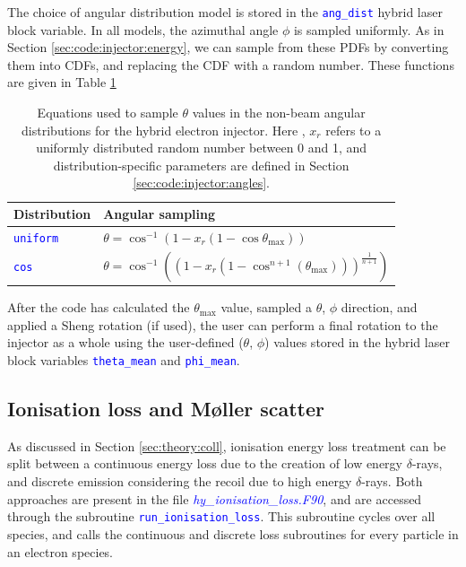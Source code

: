 \documentclass[12pt]{article}
\numberwithin{equation}{section}
\begin{document}
The choice of angular distribution model is stored in the \textcolor{blue}{\texttt{ang\_dist}} hybrid laser block variable. In all models, the azimuthal angle $\phi$ is sampled uniformly. As in Section \ref{sec:code:injector:energy}, we can sample from these PDFs by converting them into CDFs, and replacing the CDF with a random number. These functions are given in Table \ref{table:angular_sample}

\begin{table}[h!]
\centering
\begin{tabular}{l l}
  \toprule 
  Distribution & Angular sampling \\
  \midrule 
  \textcolor{blue}{\texttt{uniform}} & $\theta = \cos^{-1}\left(1 - x_r(1-\cos\theta_\text{max})\right)$ \\
  \textcolor{blue}{\texttt{cos}} & $\theta = \cos^{-1}\left((1-x_r(1-\cos^{n+1}\left(\theta_\text{max}\right)))^{\frac{1}{n+1}}\right)$ \\
  \bottomrule
\end{tabular}
  \caption{Equations used to sample $\theta$ values in the non-beam angular distributions for the hybrid electron injector. Here , $x_r$ refers to a uniformly distributed random number between 0 and 1, and distribution-specific parameters are defined in Section \ref{sec:code:injector:angles}.}
\label{table:angular_sample} 
\end{table}

After the code has calculated the $\theta_\text{max}$ value, sampled a $\theta$, $\phi$ direction, and applied a Sheng rotation (if used), the user can perform a final rotation to the injector as a whole using the user-defined ($\theta$, $\phi$) values stored in the hybrid laser block variables \textcolor{blue}{\texttt{theta\_mean}} and \textcolor{blue}{\texttt{phi\_mean}}.

\subsection{Ionisation loss and M\o{}ller scatter} \label{sec:code:ionisation}

As discussed in Section \ref{sec:theory:coll}, ionisation energy loss treatment can be split between a continuous energy loss due to the creation of low energy $\delta$-rays, and discrete emission considering the recoil due to high energy $\delta$-rays. Both approaches are present in the file \textcolor{blue}{\textit{hy\_ionisation\_loss.F90}}, and are accessed through the subroutine \textcolor{blue}{\texttt{run\_ionisation\_loss}}. This subroutine cycles over all species, and calls the continuous and discrete loss subroutines for every particle in an electron species.
\end{document}
